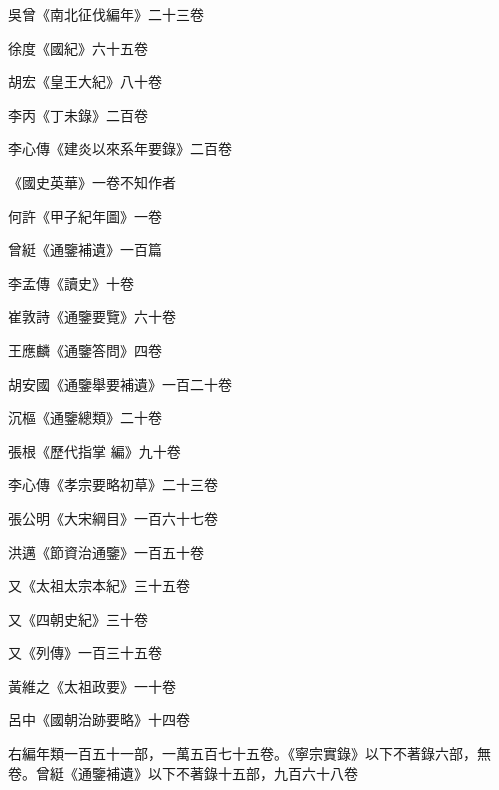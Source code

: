 \begin{pinyinscope}
 吳曾《南北征伐編年》二十三卷



 徐度《國紀》六十五卷



 胡宏《皇王大紀》八十卷



 李丙《丁未錄》二百卷



 李心傳《建炎以來系年要錄》二百卷



 《國史英華》一卷不知作者



 何許《甲子紀年圖》一卷



 曾綎《通鑒補遺》一百篇



 李孟傳《讀史》十卷



 崔敦詩《通鑒要覽》六十卷



 王應麟《通鑒答問》四卷



 胡安國《通鑒舉要補遺》一百二十卷



 沉樞《通鑒總類》二十卷



 張根《歷代指掌
 編》九十卷



 李心傳《孝宗要略初草》二十三卷



 張公明《大宋綱目》一百六十七卷



 洪邁《節資治通鑒》一百五十卷



 又《太祖太宗本紀》三十五卷



 又《四朝史紀》三十卷



 又《列傳》一百三十五卷



 黃維之《太祖政要》一十卷



 呂中《國朝治跡要略》十四卷



 右編年類一百五十一部，一萬五百七十五卷。《寧宗實錄》以下不著錄六部，無卷。曾綎《通鑒補遺》以下不著錄十五部，九百六十八卷




\end{pinyinscope}
